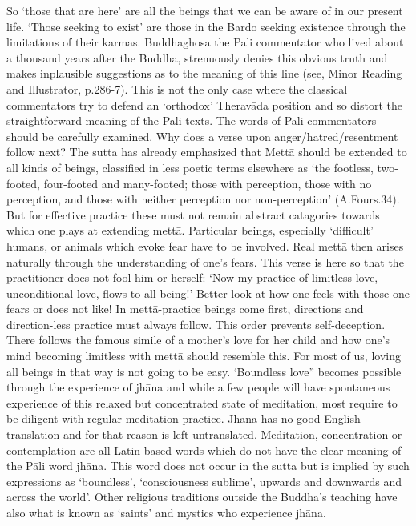    So `those that are here' are all the beings that we can be aware of in our present life. `Those seeking to exist' are those in the Bardo seeking existence through the limitations of their karmas.
   Buddhaghosa the Pali commentator who lived about a thousand years after the Buddha, strenuously denies this obvious truth and makes inplausible suggestions as to the meaning of this line (see, Minor Reading and Illustrator, p.286-7). This is not the only case where the classical commentators try to defend  an `orthodox' Therav\=ada position and so distort the straightforward meaning of the Pali texts. The words of Pali commentators should be carefully examined.
   Why does a verse upon anger/hatred/resentment follow next? The sutta has already emphasized that Mett\=a should be extended to all kinds of beings, classified in less poetic terms elsewhere as `the footless, two-footed, four-footed and many-footed; those with perception, those with no perception, and those with neither perception nor non-perception' (A.Fours.34). But for effective practice these must not remain abstract catagories towards which one plays at extending mett\=a. Particular beings, especially `difficult' humans, or animals which evoke fear have to be involved. Real mett\=a then arises naturally through the understanding of one's fears. This verse is here so that the practitioner does not fool him or herself: `Now my practice of limitless love, unconditional love, flows to all being!' Better look at how one feels with those one fears or does not like! In mett\=a-practice beings come first, directions and direction-less practice must always follow.  This order prevents self-deception.
   There follows the famous simile of a mother's love for her child and how one's mind becoming limitless with mett\=a should resemble this. For most of us, loving all beings in that way is not going to be easy. `Boundless love” becomes possible through the experience of jh\=ana and while a few people will have spontaneous experience of this relaxed but concentrated state of meditation, most require to be diligent with regular meditation practice. Jh\=ana has no good English translation and for that reason is left untranslated. Meditation, concentration or contemplation are all Latin-based words which do not have the clear meaning of the P\=ali word jh\=ana. This word does not occur in the sutta but is implied by such expressions as `boundless', `consciousness sublime', upwards and downwards and across the world'. Other religious traditions outside the Buddha's teaching have also what is known as `saints' and mystics who experience jh\=ana. 
